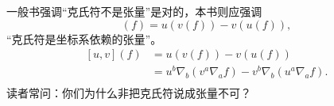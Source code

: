 \documentclass[fandol]{ctexart}
\begin{document}
一般书强调“克氏符不是张量”是对的，本书则应强调
\begin{equation}
  [u, v](f) = u(v(f)) - v(u(f)),
\end{equation}
“克氏符是坐标系依赖的张量”。
\begin{equation}
  \begin{split}
    [u, v](f)
    &= u(v(f)) - v(u(f)) \\
    &= u^b \nabla_b (v^a \nabla_a f) - v^b \nabla_b (u^a \nabla_a f). \\
  \end{split}
\end{equation}
读者常问：你们为什么非把克氏符说成张量不可？
\end{document}
